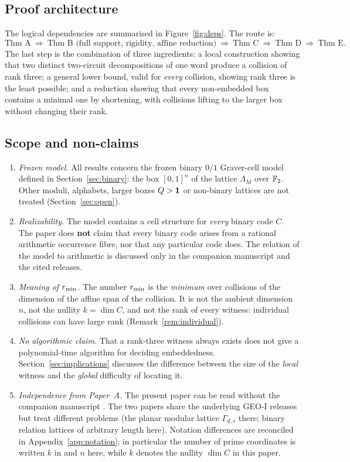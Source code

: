 \subsection{Proof architecture}

The logical dependencies are summarised in Figure~\ref{fig:deps}. The route is:
\[
\text{Thm~A}\ \Rightarrow\ \text{Thm~B (full support, rigidity, affine reduction)}\ \Rightarrow\ \text{Thm~C}\ \Rightarrow\ \text{Thm~D}\ \Rightarrow\ \text{Thm~E}.
\]
The last step is the combination of three ingredients: a local construction showing that two distinct two-circuit decompositions of one word produce a collision of rank three; a general lower bound, valid for \emph{every} collision, showing rank three is the least possible; and a reduction showing that every non-embedded box contains a minimal one by shortening, with collisions lifting to the larger box without changing their rank.

\subsection{Scope and non-claims}\label{sec:intro-scope}

\begin{enumerate}
\item \emph{Frozen model.} All results concern the frozen binary $0/1$ Graver-cell model defined in Section~\ref{sec:binary}: the box $[0,1]^n$ of the lattice $\Lambda_M$ over $\mathbb F_2$. Other moduli, alphabets, larger boxes $Q>\mathbf 1$ or non-binary lattices are not treated (Section~\ref{sec:open}).
\item \emph{Realizability.} The model contains a cell structure for \emph{every} binary code $C$. The paper does \textbf{not} claim that every binary code arises from a rational arithmetic occurrence fibre, nor that any particular code does. The relation of the model to arithmetic is discussed only in the companion manuscript \cite{PaperA} and the cited releases.
\item \emph{Meaning of $r_{\min}$.} The number $r_{\min}$ is the \emph{minimum} over collisions of the dimension of the affine span of the collision. It is not the ambient dimension $n$, not the nullity $k=\dim C$, and not the rank of every witness: individual collisions can have large rank (Remark~\ref{rem:individual}).
\item \emph{No algorithmic claim.} That a rank-three witness always exists does not give a polynomial-time algorithm for deciding embeddedness. Section~\ref{sec:implications} discusses the difference between the size of the \emph{local} witness and the \emph{global} difficulty of locating it.
\item \emph{Independence from Paper~A.} The present paper can be read without the companion manuscript \cite{PaperA}. The two papers share the underlying GEO-I releases but treat different problems (the planar modular lattice $\Gamma_{d,s}$ there; binary relation lattices of arbitrary length here). Notation differences are reconciled in Appendix~\ref{app:notation}; in particular the number of prime coordinates is written $k$ in \cite{PaperA} and $n$ here, while $k$ denotes the nullity $\dim C$ in this paper.
\end{enumerate}

